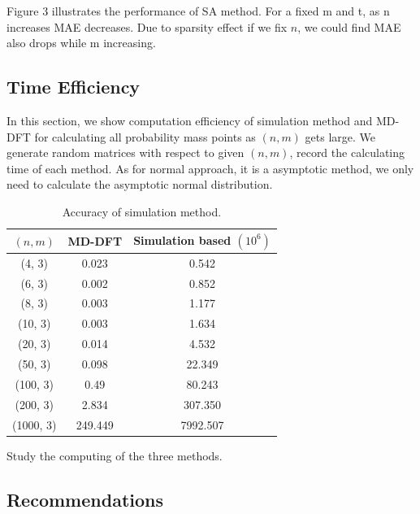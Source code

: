 \documentclass[12pt]{article}
\begin{document}
Figure 3 illustrates the performance of SA method. For a fixed m and t, as n increases MAE decreases. Due to sparsity effect if we fix $n$, we could find MAE also drops while m increasing.

\subsection{Time Efficiency}
In this section, we show computation efficiency of simulation method and MD-DFT for calculating all probability mass points as $(n,m)$ gets large. We generate random matrices with respect to given $(n, m)$, record the calculating time of each method. As for normal approach, it is a asymptotic method, we only need to calculate the asymptotic normal distribution.

\begin{table}%
\centering
\caption{Accuracy of simulation method.}\label{tab:my_label}
\begin{tabular}{c|c|c}
\hline
\hline
     $(n, m)$ & MD-DFT & Simulation based $(10^6)$  \\
\hline
    (4, 3) & 0.023 & 0.542 \\
\hline
    (6, 3) & 0.002 & 0.852\\
\hline
    (8, 3) & 0.003 & 1.177\\
    (10, 3) & 0.003 & 1.634\\
    (20, 3) & 0.014 & 4.532\\
    (50, 3) & 0.098 & 22.349\\
    (100, 3) & 0.49 & 80.243\\
    (200, 3) & 2.834 & 307.350\\
    (1000, 3) & 249.449  & 7992.507 \\
\hline\hline
\end{tabular}
\end{table}
Study the computing of the three methods.


\subsection{Recommendations}
\end{document}
